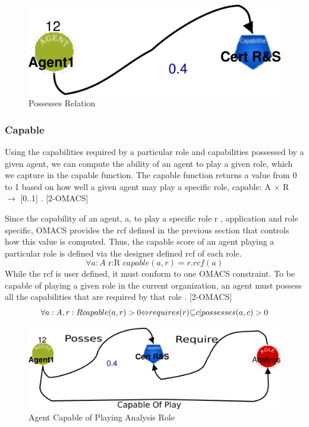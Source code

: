 \begin{figure}[th]
	\centering
		\includegraphics{chapiter1/img/p}
	\caption{\label{fig:Possesses Relation}Possesses Relation }
\end{figure}


\subsubsection{Capable}
Using the capabilities required by a particular role and capabilities possessed by a given agent, we can compute the ability of an agent to play a given role, which we capture in the capable function. The capable function returns a value from 0 to 1 based on how well a given agent may play a specific role, capable: A $\times$ R $\rightarrow$ {[}0..1{]} . [2-OMACS]

Since the capability of an agent, a, to play a specific role  r , application and role specific, OMACS provides the rcf defined in the previous section that controls how this value is computed. Thus, the capable score of an agent playing a particular role is defined via the designer defined rcf of each role.
\begin{equation}
\forall a:A\textrm{ r:R }capable(a,r)=r.rcf(a)\label{eq:Funccapable}
\end{equation}
While the rcf is user defined, it must conform to one OMACS constraint. 
To be capable of playing a given role in the current organization,
 an agent must possess all the capabilities that are required by that role . [2-OMACS]
\begin{equation}
\text{\ensuremath{\forall}}a:A,r:Rcapable(a,r)>0\text{\ensuremath{\Leftrightarrow}}requires(r)\text{\ensuremath{\subseteq}}{c|possesses(a,c)>0}\label{eq:FuncCapable2}
\end{equation}



\begin{figure}[th]
	\centering
		\includegraphics{chapiter1/img/c}
	\caption{\label{fig:Capable Of playing Relation} Agent Capable of Playing Analysis Role}
\end{figure}

